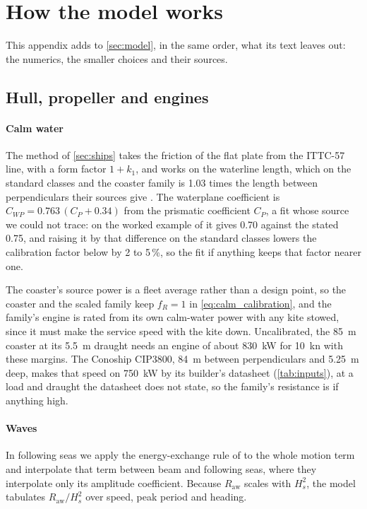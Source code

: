 \section{How the model works}
\label{sec:details}

This appendix adds to \cref{sec:model}, in the same order, what its text leaves out: the numerics, the smaller choices and their sources.

\subsection{Hull, propeller and engines}
\label{sec:det_ships}

\paragraph{Calm water} The method of \cref{sec:ships} takes the friction of the flat plate from the ITTC-57 line, with a form factor $1+k_1$, and works on the waterline length, which on the standard classes and the coaster family is 1.03 times the length between perpendiculars their sources give \citep{man2011}. The waterplane coefficient is $C_{WP}=0.763\,(C_P+0.34)$ from the prismatic coefficient $C_P$, a fit whose source we could not trace: on the worked example of \citet{holtrop1982} it gives 0.70 against the stated 0.75, and raising it by that difference on the standard classes lowers the calibration factor below by 2 to 5\,\%, so the fit if anything keeps that factor nearer one.

The coaster's source power is a fleet average rather than a design point, so the coaster and the scaled family keep $f_R=1$ in \cref{eq:calm_calibration}, and the family's engine is rated from its own calm-water power with any kite stowed, since it must make the service speed with the kite down. Uncalibrated, the \SI{85}{m} coaster at its \SI{5.5}{m} draught needs an engine of about \SI{830}{kW} for \SI{10}{kn} with these margins. The Conoship CIP3800, \SI{84}{m} between perpendiculars and \SI{5.25}{m} deep, makes that speed on \SI{750}{kW} by its builder's datasheet (\cref{tab:inputs}), at a load and draught the datasheet does not state, so the family's resistance is if anything high.

\paragraph{Waves} In following seas we apply the energy-exchange rule of \citet{mittendorf2022} to the whole motion term and interpolate that term between beam and following seas, where they interpolate only its amplitude coefficient. Because $R_\mathrm{aw}$ scales with $H_s^2$, the model tabulates $R_\mathrm{aw}/H_s^2$ over speed, peak period and heading.

